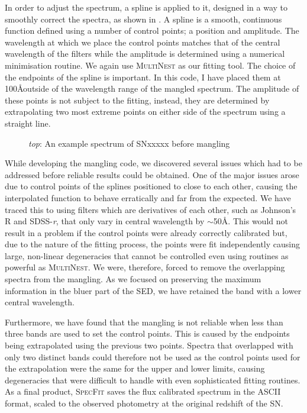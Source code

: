 In order to adjust the spectrum, a spline is applied to it, designed in a way to smoothly correct the spectra, as shown in . A spline is a smooth, continuous function defined using a number of control points; a position and amplitude. The wavelength at which we place the control points matches that of the central wavelength of the filters while the amplitude is determined using a numerical minimisation routine. We again use \textsc{MultiNest} as our fitting tool. The choice of the endpoints of the spline is important. In this code, I have placed them at 100\AA outside of the wavelength range of the mangled spectrum. The amplitude of these points is not subject to the fitting, instead, they are determined by extrapolating two most extreme points on either side of the spectrum using a straight line.

\begin{figure}
  \caption{\textit{top}: An example spectrum of SNxxxxx before mangling  }
  \label{fig:SpecMangling}
\end{figure}

While developing the mangling code, we discovered several issues which had to be addressed before reliable results could be obtained. One of the major issues arose due to control points of the splines positioned to close to each other, causing the interpolated function to behave erratically and far from the expected. We have traced this to using filters which are derivatives of each other, such as Johnson's R and SDSS-\textit{r}, that only vary in central wavelength by $\sim$50\AA. This would not result in a problem if the control points were already correctly calibrated but, due to the nature of the fitting process, the points were fit independently causing large, non-linear degeneracies that cannot be controlled even using routines as powerful as \textsc{MultiNest}. We were, therefore, forced to remove the overlapping spectra from the mangling. As we focused on preserving the maximum information in the bluer part of the SED, we have retained the band with a lower central wavelength.

Furthermore, we have found that the mangling is not reliable when less than three bands are used to set the control points. This is caused by the endpoints being extrapolated using the previous two points. Spectra that overlapped with only two distinct bands could therefore not be used as the control points used for the extrapolation were the same for the upper and lower limits, causing degeneracies that were difficult to handle with even sophisticated fitting routines. As a final product, \textsc{SpecFit} saves the flux calibrated spectrum in the ASCII format, scaled to the observed photometry at the original redshift of the SN.

